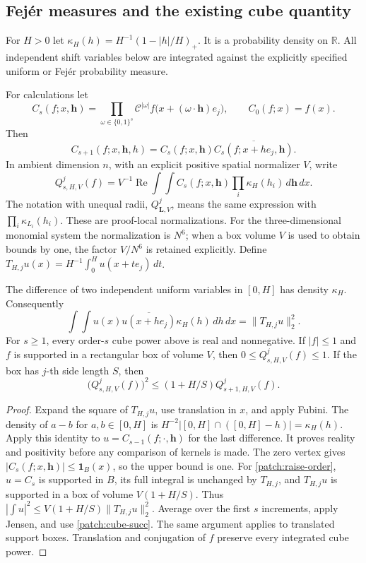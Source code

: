 \documentclass[11pt]{article}
\theoremstyle{definition}
\newcommand{\R}{\mathbb R}
\begin{document}
\subsection{Fej\'er measures and the existing cube quantity}
\begin{definition}\label{def:local-uniformity}
For $H>0$ let $\kappa_H(h)=H^{-1}(1-|h|/H)_+$. It is a probability density on $\R$.
All independent shift variables below are integrated against the explicitly specified
uniform or Fej\'er probability measure.
\end{definition}
For calculations let
\[
 C_s(f;x,\mathbf h)=\prod_{\omega\in\{0,1\}^s}
       \mathcal C^{|\omega|}f\bigl(x+(\omega\cdot\mathbf h)e_j\bigr),
 \qquad C_0(f;x)=f(x).
\]
Then
\[
 \label{patch:cube-succ}
 C_{s+1}(f;x,\mathbf h,h)=C_s(f;x,\mathbf h)
                                  \overline{C_s(f;x+he_j,\mathbf h)}.
 \tag{\theequation}
\]
In ambient dimension $n$, with an explicit positive spatial normalizer $V$, write
\[
 Q_{s,H,V}^{j}(f)=V^{-1}\operatorname{Re}\int\!\int C_s(f;x,\mathbf h)
                                   \prod_i\kappa_H(h_i)\,d\mathbf h\,dx.
\]
The notation with unequal radii, $Q_{\mathbf L,V}^{j}$, means the same expression with
$\prod_i\kappa_{L_i}(h_i)$.  These are proof-local normalizations.  For the three-dimensional monomial system the normalization is $N^6$; when a box volume
$V$ is used to obtain bounds by one, the factor $V/N^6$ is retained explicitly.
Define $T_{H,j}u(x)=H^{-1}\int_0^H u(x+te_j)\,dt$.

\begin{lemma}\label{patch:fejer-squares}
The difference of two independent uniform variables in $[0,H]$ has density $\kappa_H$.
Consequently
\[
 \int\!\int u(x)\overline{u(x+he_j)}\kappa_H(h)\,dh\,dx
       =\|T_{H,j}u\|_2^2.
\]
For $s\geq1$, every order-$s$ cube power above is real and nonnegative.  If $|f|\leq1$ and $f$ is supported in a
rectangular box of volume $V$, then $0\leq Q_{s,H,V}^{j}(f)\leq1$.
If the box has $j$-th side length $S$, then
\[
 \label{patch:raise-order}
 \bigl(Q_{s,H,V}^{j}(f)\bigr)^2
       \leq(1+H/S)Q_{s+1,H,V}^{j}(f).
 \tag{\theequation}
\]
\end{lemma}
\begin{proof}
Expand the square of $T_{H,j}u$, use translation in $x$, and apply Fubini.  The density of
$a-b$ for $a,b\in[0,H]$ is $H^{-2}|[0,H]\cap([0,H]-h)|=\kappa_H(h)$.
Apply this identity to $u=C_{s-1}(f;\cdot,\mathbf h)$ for the last difference.  It proves
reality and positivity before any comparison of kernels is made.  The zero vertex gives
$|C_s(f;x,\mathbf h)|\leq\mathbf1_B(x)$, so the upper bound is one.
For \eqref{patch:raise-order}, $u=C_s$ is supported in $B$, its full integral is unchanged
by $T_{H,j}$, and $T_{H,j}u$ is supported in a box of volume $V(1+H/S)$.
Thus $|\int u|^2\leq V(1+H/S)\|T_{H,j}u\|_2^2$.  Average over the first $s$ increments,
apply Jensen, and use \eqref{patch:cube-succ}.  The same argument applies to translated
support boxes.  Translation and conjugation of $f$ preserve every integrated cube power.
\end{proof}
\end{document}
